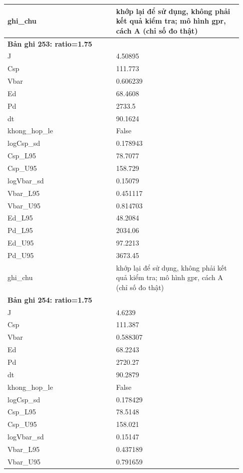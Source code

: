 \begin{longtable}{p{0.43\linewidth}p{0.50\linewidth}}
ghi\_\allowbreak chu & khớp lại để sử dụng, không phải kết quả kiểm tra; mô hình gpr, cách A (chỉ số đo thật) \\
\midrule
\multicolumn{2}{p{0.95\linewidth}}{\textbf{Bản ghi 253: ratio=1.75}} \\
J & 4.50895 \\
Csp & 111.773 \\
Vbar & 0.606239 \\
Ed & 68.4608 \\
Pd & 2733.5 \\
dt & 90.1624 \\
khong\_\allowbreak hop\_\allowbreak le & False \\
logCsp\_\allowbreak sd & 0.178943 \\
Csp\_\allowbreak L95 & 78.7077 \\
Csp\_\allowbreak U95 & 158.729 \\
logVbar\_\allowbreak sd & 0.15079 \\
Vbar\_\allowbreak L95 & 0.451117 \\
Vbar\_\allowbreak U95 & 0.814703 \\
Ed\_\allowbreak L95 & 48.2084 \\
Pd\_\allowbreak L95 & 2034.06 \\
Ed\_\allowbreak U95 & 97.2213 \\
Pd\_\allowbreak U95 & 3673.45 \\
ghi\_\allowbreak chu & khớp lại để sử dụng, không phải kết quả kiểm tra; mô hình gpr, cách A (chỉ số đo thật) \\
\midrule
\multicolumn{2}{p{0.95\linewidth}}{\textbf{Bản ghi 254: ratio=1.75}} \\
J & 4.6239 \\
Csp & 111.387 \\
Vbar & 0.588307 \\
Ed & 68.2243 \\
Pd & 2720.27 \\
dt & 90.2879 \\
khong\_\allowbreak hop\_\allowbreak le & False \\
logCsp\_\allowbreak sd & 0.178429 \\
Csp\_\allowbreak L95 & 78.5148 \\
Csp\_\allowbreak U95 & 158.021 \\
logVbar\_\allowbreak sd & 0.15147 \\
Vbar\_\allowbreak L95 & 0.437189 \\
Vbar\_\allowbreak U95 & 0.791659 \\

\end{longtable}
